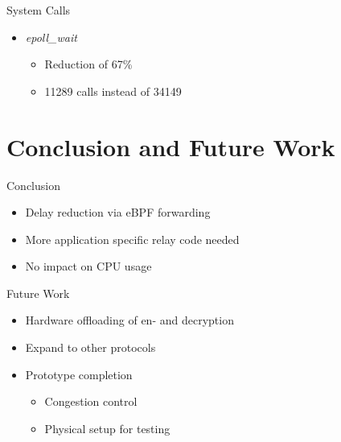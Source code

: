 \documentclass[shortpres,aspectratio=43]{beamer}
\newlength{\mylength}
\begin{document}
\begin{frame}{System Calls}
\begin{minipage}{0.51\textwidth}
\begin{itemize}
            \item \textit{epoll\_wait}
            \vspace{2\mylength}
            \begin{itemize}
                \item Reduction of 67\%
                \vspace{2\mylength}
                \item 11289 calls instead of 34149
            \end{itemize}
            \vspace{2\mylength}
        \end{itemize}
    \end{minipage}
\end{frame}


\section{Conclusion and Future Work}

\begin{frame}{}
  \tableofcontents[currentsection]
\end{frame}

\begin{frame}{Conclusion}
    \begin{itemize}
        \item Delay reduction via eBPF forwarding
        \vspace{2\mylength}
        \item More application specific relay code needed
        \vspace{2\mylength}
        \item No impact on CPU usage
    \end{itemize}
\end{frame}

\begin{frame}{Future Work}
    \begin{itemize}
        \item Hardware offloading of en- and decryption
        \vspace{2\mylength}
        \item Expand to other protocols
        \vspace{2\mylength}
        \item Prototype completion
        \vspace{2\mylength}
        \begin{itemize}
            \item Congestion control
            \vspace{2\mylength}
            \item Physical setup for testing
        \end{itemize}
    \end{itemize}
\end{frame}
\end{document}
